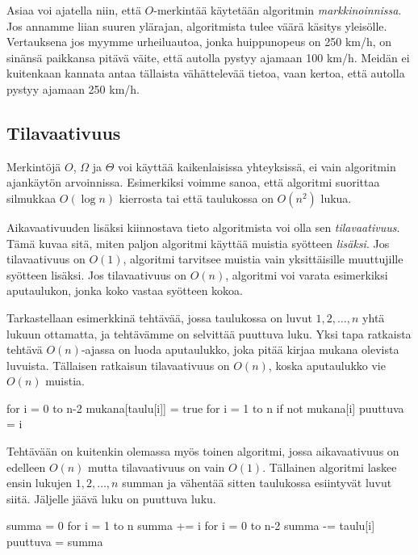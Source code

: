 Asiaa voi ajatella niin, että $O$-merkintää käytetään algoritmin
\emph{markkinoinnissa}. Jos annamme liian suuren ylärajan, algoritmista
tulee väärä käsitys yleisölle.
Vertauksena jos myymme urheiluautoa, jonka huippunopeus on 250 km/h,
on sinänsä paikkansa pitävä väite, että autolla pystyy ajamaan 100 km/h.
Meidän ei kuitenkaan kannata antaa tällaista vähättelevää tietoa,
vaan kertoa, että autolla pystyy ajamaan 250 km/h.

\subsection{Tilavaativuus}


Merkintöjä $O$, $\Omega$ ja $\Theta$ voi käyttää
kaikenlaisissa yhteyksissä, ei vain algoritmin ajankäytön arvoinnissa.
Esimerkiksi voimme sanoa, että algoritmi suorittaa silmukkaa $O(\log n)$ kierrosta
tai että taulukossa on $O(n^2)$ lukua.

Aikavaativuuden lisäksi kiinnostava tieto algoritmista voi olla sen
\emph{tilavaativuus}. Tämä kuvaa sitä, miten paljon algoritmi
käyttää muistia syötteen \emph{lisäksi}.
Jos tilavaativuus on $O(1)$, algoritmi tarvitsee muistia
vain yksittäisille muuttujille syötteen lisäksi.
Jos tilavaativuus on $O(n)$, algoritmi voi varata esimerkiksi aputaulukon,
jonka koko vastaa syötteen kokoa.

Tarkastellaan esimerkkinä tehtävää, jossa taulukossa on
luvut $1,2,\dots,n$ yhtä lukuun ottamatta,
ja tehtävämme on selvittää puuttuva luku.
Yksi tapa ratkaista tehtävä $O(n)$-ajassa on luoda aputaulukko,
joka pitää kirjaa mukana olevista luvuista.
Tällaisen ratkaisun tilavaativuus on $O(n)$,
koska aputaulukko vie $O(n)$ muistia.

\begin{code}
for i = 0 to n-2
    mukana[taulu[i]] = true
for i = 1 to n
    if not mukana[i]
        puuttuva = i
\end{code}

Tehtävään on kuitenkin olemassa myös toinen algoritmi,
jossa aikavaativuus on edelleen $O(n)$ mutta tilavaativuus on vain $O(1)$.
Tällainen algoritmi laskee ensin lukujen $1,2,\dots,n$ summan
ja vähentää sitten taulukossa esiintyvät luvut siitä.
Jäljelle jäävä luku on puuttuva luku.

\begin{code}
summa = 0
for i = 1 to n
    summa += i
for i = 0 to n-2
    summa -= taulu[i]
puuttuva = summa
\end{code}

